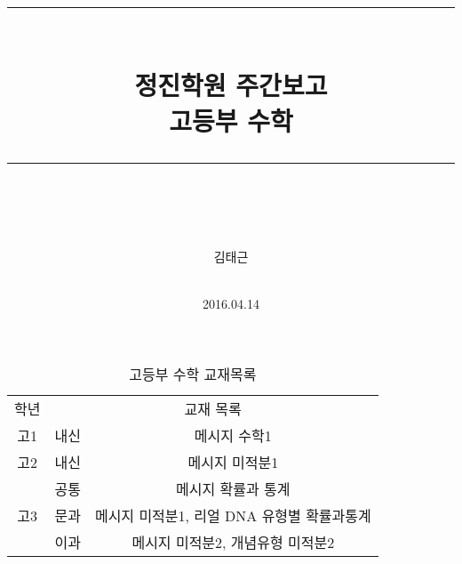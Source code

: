\documentclass[idxtotoc,hyperref,openany]{labbook} %
\newcommand{\HRule}{\rule{\linewidth}{0.5mm}} %
\begin{document}

\frontmatter %
\title{
\begin{center}
\HRule \\[0.4cm]
{\Huge \bfseries 정진학원 주간보고  \\[0.5cm] \Large 고등부 수학}\\[0.4cm] %
\HRule \\[1.5cm]
\end{center}
}
\author{\LARGE 김태근 \\  \\[2cm]} %
\date{2016.04.14} %
\maketitle

\tableofcontents

\mainmatter %












\begin{table}[h]
\centering
\begin{adjustbox}{width=\textwidth}
\begin{tabular}{c||c|c}
\toprule
\midrule
학년 & \multicolumn{2}{c}{교재 목록} \\
\hhline{=||==}
고1 & 내신 & 메시지 수학1 \\
\hline
고2 & 내신 & 메시지 미적분1\\
\hline
\multirow{3}{*}{고3} & 공통 & 메시지 확률과 통계 \\ \hhline{~--}
					& 문과 & 메시지 미적분1, 리얼 DNA 유형별 확률과통계\\ \hhline{~--}
					& 이과 & 메시지 미적분2, 개념유형 미적분2\\

\hline
\end{tabular}
\end{adjustbox}
\caption{\label{tab:i} 고등부 수학 교재목록 }
\end{table}
\end{document}
